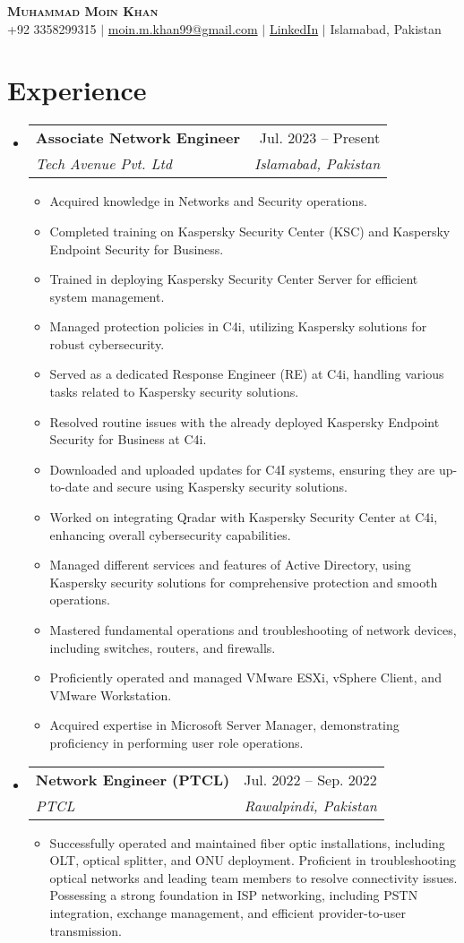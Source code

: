 \documentclass[letterpaper,11pt]{article}
\makeatletter
\newcommand{\resumeItem}[1]{
  \item\small{
    {#1 \vspace{-2pt}}
  }
}
\newcommand{\resumeSubheading}[4]{
  \vspace{-0.5pt}\item
    \begin{tabular*}{0.97\textwidth}[t]{l@{\extracolsep{\fill}}r}
      \textbf{#1} & #2 \\
      \textit{#3} & \textit{\small #4} \\
    \end{tabular*}\vspace{-7pt}
}
\newcommand{\resumeSubHeadingListStart}{\begin{itemize}[leftmargin=0.15in, label={}]}
\newcommand{\resumeSubHeadingListEnd}{\end{itemize}}
\newcommand{\resumeItemListStart}{\begin{itemize}}
\newcommand{\resumeItemListEnd}{\end{itemize}\vspace{-7pt}}
\makeatother
\begin{document}
\begin{center}
    \textbf{\Huge \scshape Muhammad Moin Khan} \\ \vspace{1pt}
    \small +92 3358299315 $|$ \href{mailto:moin.m.khan99@gmail.com}{moin.m.khan99@gmail.com} $|$
    \href{https://www.linkedin.com/in/moinmkhan/}{LinkedIn} $|$ Islamabad, Pakistan
\end{center}

\section{Experience}
  \resumeSubHeadingListStart
    \resumeSubheading
      {Associate Network Engineer}{Jul. 2023 -- Present}
      {Tech Avenue Pvt. Ltd}{Islamabad, Pakistan}
      \resumeItemListStart
        \resumeItem{Acquired knowledge in Networks and Security operations.}
        \resumeItem{Completed training on Kaspersky Security Center (KSC) and Kaspersky Endpoint Security for Business.}
        \resumeItem{Trained in deploying Kaspersky Security Center Server for efficient system management.}
        \resumeItem{Managed protection policies in C4i, utilizing Kaspersky solutions for robust cybersecurity.}
        \resumeItem{Served as a dedicated Response Engineer (RE) at C4i, handling various tasks related to Kaspersky security solutions.}
        \resumeItem{Resolved routine issues with the already deployed Kaspersky Endpoint Security for Business at C4i.}
        \resumeItem{Downloaded and uploaded updates for C4I systems, ensuring they are up-to-date and secure using Kaspersky security solutions.}
        \resumeItem{Worked on integrating Qradar with Kaspersky Security Center at C4i, enhancing overall cybersecurity capabilities.}
        \resumeItem{Managed different services and features of Active Directory, using Kaspersky security solutions for comprehensive protection and smooth operations.}
        \resumeItem{Mastered fundamental operations and troubleshooting of network devices, including switches, routers, and firewalls.}
        \resumeItem{Proficiently operated and managed VMware ESXi, vSphere Client, and VMware Workstation.}
        \resumeItem{Acquired expertise in Microsoft Server Manager, demonstrating proficiency in performing user role operations.}
      \resumeItemListEnd
    \resumeSubHeadingListEnd

\resumeSubHeadingListStart
    \resumeSubheading
      {Network Engineer (PTCL)}{Jul. 2022 -- Sep. 2022}
      {PTCL}{Rawalpindi, Pakistan}
      \resumeItemListStart
        \resumeItem{Successfully operated and maintained fiber optic installations, including OLT, optical splitter, and ONU deployment. Proficient in troubleshooting optical networks and leading team members to resolve connectivity issues. Possessing a strong foundation in ISP networking, including PSTN integration, exchange management, and efficient provider-to-user transmission.}
      \resumeItemListEnd
    \resumeSubHeadingListEnd
\end{document}
